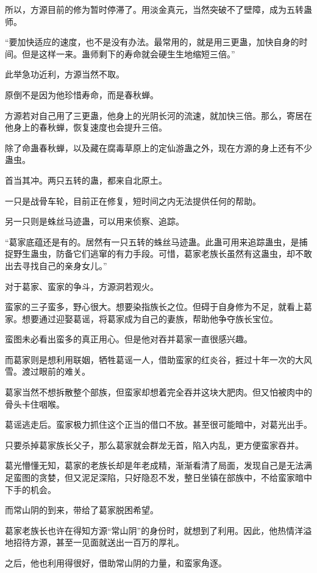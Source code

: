 \begin{this_body}
所以，方源目前的修为暂时停滞了。用淡金真元，当然突破不了壁障，成为五转蛊师。

“要加快适应的速度，也不是没有办法。最常用的，就是用三更蛊，加快自身的时间。但是这样一来。蛊师剩下的寿命就会硬生生地缩短三倍。”

此举急功近利，方源当然不取。

原倒不是因为他珍惜寿命，而是春秋蝉。

方源若对自己用了三更蛊，他身上的光阴长河的流速，就加快三倍。那么，寄居在他身上的春秋蝉，恢复速度也会提升三倍。

除了命蛊春秋蝉，以及藏在腐毒草原上的定仙游蛊之外，现在方源的身上还有不少蛊虫。

首当其冲。两只五转的蛊，都来自北原土。

一只是战骨车轮，目前正在修复，短时间之内无法提供任何的帮助。

另一只则是蛛丝马迹蛊，可以用来侦察、追踪。

“葛家底蕴还是有的。居然有一只五转的蛛丝马迹蛊。此蛊可用来追踪蛊虫，是捕捉野生蛊虫，防备它们逃窜的有力手段。可惜，葛家老族长虽然有这蛊虫，却不敢出去寻找自己的亲身女儿。”

对于葛家、蛮家的争斗，方源洞若观火。

蛮家的三子蛮多，野心很大。想要染指族长之位。但碍于自身修为不足，就看上葛家。想要通过迎娶葛谣，将葛家成为自己的妻族，帮助他争夺族长宝位。

蛮图未必看出蛮多的真正用心。但是他对吞并葛家一直很感兴趣。

而葛家则是想利用联姻，牺牲葛谣一人，借助蛮家的红炎谷，捱过十年一次的大风雪。渡过眼前的难关。

葛家当然不想拆散整个部族，但蛮家却想着完全吞并这块大肥肉。但又怕被肉中的骨头卡住咽喉。

葛谣逃走后。蛮家极力抓住这个正当的借口不放。甚至很可能暗中，对葛光出手。

只要杀掉葛家族长父子，那么葛家就会群龙无首，陷入内乱，更方便蛮家吞并。

葛光懵懂无知，葛家的老族长却是年老成精，渐渐看清了局面，发现自己是无法满足蛮图的贪婪，但又泥足深陷，只好隐忍不发，整日坐镇在部族中，不给蛮家暗中下手的机会。

而常山阴的到来，带给了葛家脱困希望。

葛家老族长也许在得知方源“常山阴”的身份时，就想到了利用。因此，他热情洋溢地招待方源，甚至一见面就送出一百万的厚礼。

之后，他也利用得很好，借助常山阴的力量，和蛮家角逐。


\end{this_body}
